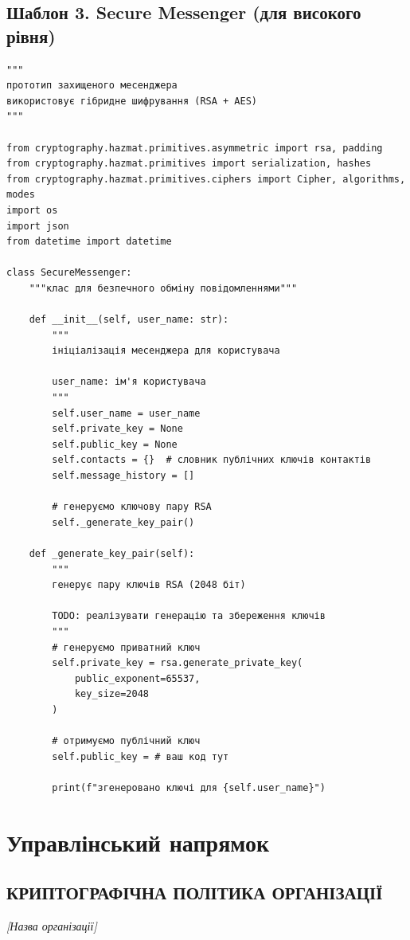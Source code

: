 \subsection*{Шаблон 3. Secure Messenger (для високого рівня)}

\begin{lstlisting}[caption={Прототип захищеного месенджера}]
"""
прототип захищеного месенджера
використовує гібридне шифрування (RSA + AES)
"""

from cryptography.hazmat.primitives.asymmetric import rsa, padding
from cryptography.hazmat.primitives import serialization, hashes
from cryptography.hazmat.primitives.ciphers import Cipher, algorithms, modes
import os
import json
from datetime import datetime

class SecureMessenger:
    """клас для безпечного обміну повідомленнями"""
    
    def __init__(self, user_name: str):
        """
        ініціалізація месенджера для користувача
        
        user_name: ім'я користувача
        """
        self.user_name = user_name
        self.private_key = None
        self.public_key = None
        self.contacts = {}  # словник публічних ключів контактів
        self.message_history = []
        
        # генеруємо ключову пару RSA
        self._generate_key_pair()
    
    def _generate_key_pair(self):
        """
        генерує пару ключів RSA (2048 біт)
        
        TODO: реалізувати генерацію та збереження ключів
        """
        # генеруємо приватний ключ
        self.private_key = rsa.generate_private_key(
            public_exponent=65537,
            key_size=2048
        )
        
        # отримуємо публічний ключ
        self.public_key = # ваш код тут
        
        print(f"згенеровано ключі для {self.user_name}")
\end{lstlisting}

\newpage
\section*{\centering Управлінський напрямок}

\subsection*{КРИПТОГРАФІЧНА ПОЛІТИКА ОРГАНІЗАЦІЇ}
\textit{[Назва організації]}

